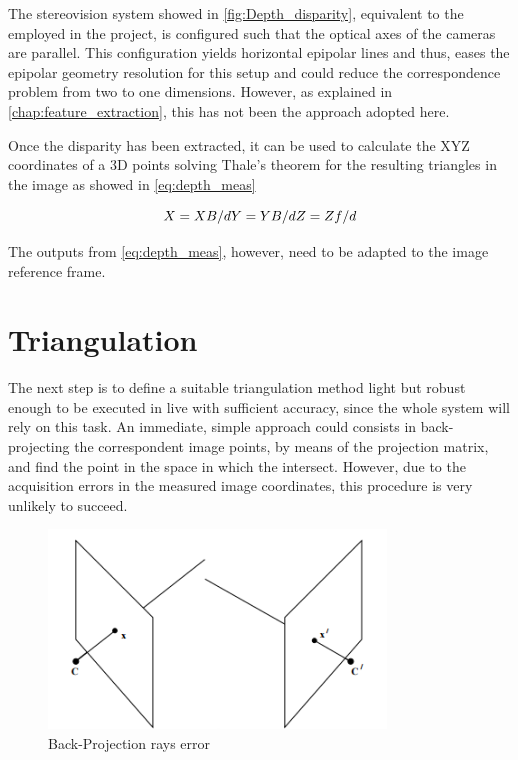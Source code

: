 The stereovision system showed in \ref{fig:Depth_disparity}, equivalent to the employed in the project, is configured such that the optical axes of the cameras are parallel. 
This configuration yields horizontal epipolar lines and thus, eases the epipolar geometry resolution for this setup and could reduce the correspondence problem from two to one dimensions. However, as explained in \ref{chap:feature_extraction}, this has not been the approach adopted here. 

Once the disparity has been extracted, it can be used to calculate the XYZ coordinates of a 3D points solving Thale's theorem for the resulting triangles in the image as showed in \ref{eq:depth_meas} 

\begin{equation}
	X = XB/d $$
	Y = YB/d $$
	Z = Zf/d 	
	\label{eq:depth_meas}
\end{equation}  

The outputs from \ref{eq:depth_meas}, however, need to be adapted to the image reference frame. 

\section{Triangulation}
The next step is to define a suitable triangulation method light but robust enough to be executed in live with sufficient accuracy, since the whole system will rely on this task. 
An immediate, simple approach could consists in back-projecting the correspondent image points, by means of the projection matrix, and find the point in the space in which the intersect. However, due to the acquisition errors in the measured image coordinates, this procedure is very unlikely to succeed. 

\begin{figure}[h]
    \centering
   \includegraphics[width=0.8\textwidth]{figures/back_projection}
    \caption{Back-Projection rays error}
    \label{fig:Back-Projection}
\end{figure}

